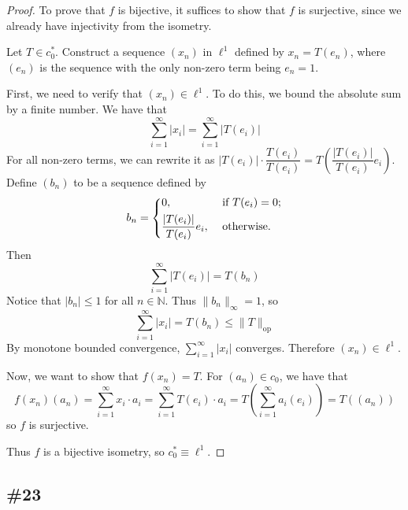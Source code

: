 \documentclass{article}
\newcommand{\op}{\mathrm{op}}
\theoremstyle{plain} %
\numberwithin{thm}{section} %
\theoremstyle{definition}
\begin{document}
\begin{proof}
            To prove that \(f\) is bijective, it suffices to show that \(f\) is surjective, since we already have injectivity from the isometry.

            Let \(T \in c_0^*\). Construct a sequence \((x_n)\) in \(\ell ^1\) defined by \(x_n = T(e_n)\), where \((e_n)\) is the sequence with the only non-zero term being \(e_n = 1\).

            First, we need to verify that \((x_n) \in \ell ^1\). To do this, we bound the absolute sum by a finite number. We have that
            \[
                \sum_{i=1}^{\infty} |x_i| = \sum_{i=1}^{\infty} |T(e_i)|
            \]
            For all non-zero terms, we can rewrite it as \(|T(e_i)| \cdot \dfrac{T(e_i)}{T(e_i)} = T\left(\dfrac{|T(e_i)|}{T(e_i)}e_i\right)\). Define \((b_n)\) to be a sequence defined by
            \[
                b_n = \begin{dcases}
                    0, &\text{ if } T(e_i) = 0;\\
                    \frac{|T(e_i)|}{T(e_i)}e_i, &\text{ otherwise} .
                \end{dcases}
            \]
            Then
            \[
                \sum_{i=1}^{\infty} |T(e_i)| = T(b_n)
            \]
            Notice that \(|b_n| \leq 1\) for all \(n \in \mathbb{N}\). Thus \(\|b_n\| _{\infty} = 1\), so
            \[
                \sum_{i=1}^{\infty} |x_i| = T(b_n) \leq \|T\| _{\op}
            \]
            By monotone bounded convergence, \(\sum_{i=1}^{\infty} |x_i|\) converges. Therefore \((x_n) \in \ell ^1\).

            Now, we want to show that \(f(x_n) = T\). For \((a_n) \in c_0\), we have that
            \[
                f(x_n)(a_n) = \sum_{i=1}^{\infty} x_i \cdot a_i = \sum_{i=1}^{\infty} T(e_i) \cdot a_i = T\left(\sum_{i=1}^{\infty} a_i (e_i)\right) = T((a_n))
            \]
            so \(f\) is surjective.

            Thus \(f\) is a bijective isometry, so \(c_0^* \equiv \ell ^1\).
        \end{proof}

        \subsection{\#23}
\end{document}
